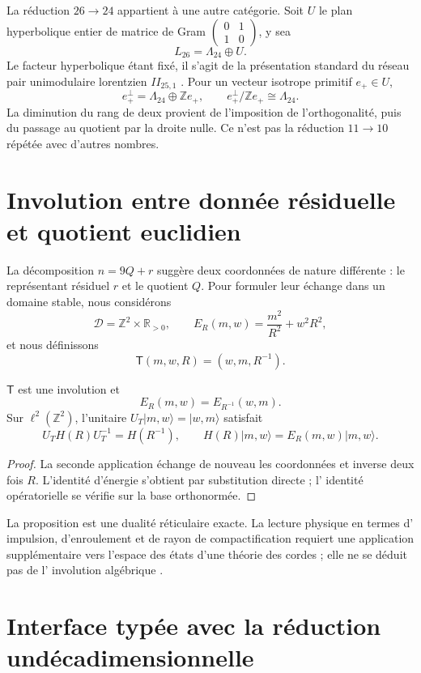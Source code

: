 La réduction \(26\to24\) appartient à une autre catégorie. Soit \(U\) le plan
hyperbolique entier de matrice de Gram
\(\left(\begin{smallmatrix}0&1\\1&0\end{smallmatrix}\right)\), y sea
\[
 L_{26}=\Lambda_{24}\oplus U.
\]
Le facteur hyperbolique étant fixé, il s'agit de la présentation standard du
réseau pair unimodulaire lorentzien \(II_{25,1}\)
\cite{ConwaySloane1999}.
Pour un vecteur isotrope primitif \(e_+\in U\),
\[
 e_+^\perp=\Lambda_{24}\oplus\mathbb Ze_+,
\qquad
 e_+^\perp/\mathbb Ze_+\cong\Lambda_{24}.
\]
La diminution du rang de deux provient de l'imposition de l'orthogonalité, puis du passage au quotient
par la droite nulle. Ce n'est pas la réduction \(11\to10\) répétée avec d'autres
nombres.

\section{Involution entre donnée résiduelle et quotient euclidien}

La décomposition \(n=9Q+r\) suggère deux coordonnées de nature différente :
le représentant résiduel \(r\) et le quotient \(Q\). Pour formuler leur
échange dans un domaine stable, nous considérons
\[
 \mathcal D=\mathbb Z^2\times\mathbb R_{>0},
\qquad
 E_R(m,w)=\frac{m^2}{R^2}+w^2R^2,
\]
et nous définissons
\[
 \mathsf T(m,w,R)=(w,m,R^{-1}).
\]
\begin{proposition}
\(\mathsf T\) est une involution et
\[
 E_R(m,w)=E_{R^{-1}}(w,m).
\]
Sur \(\ell^2(\mathbb Z^2)\), l'unitaire
\(U_T|m,w\rangle=|w,m\rangle\) satisfait
\[
 U_TH(R)U_T^{-1}=H(R^{-1}),
\qquad
 H(R)|m,w\rangle=E_R(m,w)|m,w\rangle.
\]
\end{proposition}
\begin{proof}
La seconde application échange de nouveau les coordonnées et inverse deux
fois \(R\). L'identité d'énergie s'obtient par substitution directe ; l'
identité opératorielle se vérifie sur la base orthonormée.
\end{proof}

La proposition est une dualité réticulaire exacte. La lecture physique en termes d'
impulsion, d'enroulement et de rayon de compactification requiert une application supplémentaire
vers l'espace des états d'une théorie des cordes ; elle ne se déduit pas de l'
involution algébrique \cite{Giveon1994}.

\section{Interface typée avec la réduction undécadimensionnelle}

